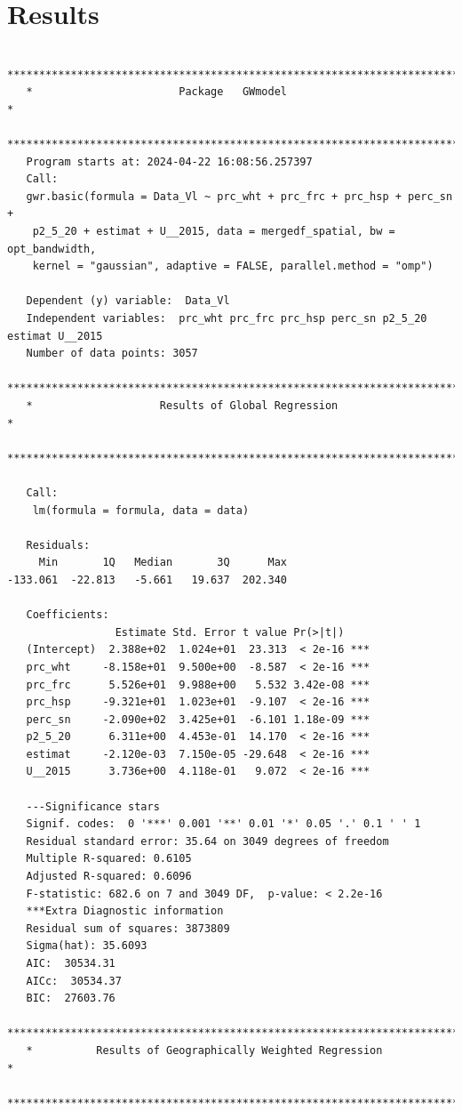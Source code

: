 \documentclass[
]{article}
\begin{document}
\section{Results}\label{results}

\begin{verbatim}
   ***********************************************************************
   *                       Package   GWmodel                             *
   ***********************************************************************
   Program starts at: 2024-04-22 16:08:56.257397 
   Call:
   gwr.basic(formula = Data_Vl ~ prc_wht + prc_frc + prc_hsp + perc_sn + 
    p2_5_20 + estimat + U__2015, data = mergedf_spatial, bw = opt_bandwidth, 
    kernel = "gaussian", adaptive = FALSE, parallel.method = "omp")

   Dependent (y) variable:  Data_Vl
   Independent variables:  prc_wht prc_frc prc_hsp perc_sn p2_5_20 estimat U__2015
   Number of data points: 3057
   ***********************************************************************
   *                    Results of Global Regression                     *
   ***********************************************************************

   Call:
    lm(formula = formula, data = data)

   Residuals:
     Min       1Q   Median       3Q      Max 
-133.061  -22.813   -5.661   19.637  202.340 

   Coefficients:
                 Estimate Std. Error t value Pr(>|t|)    
   (Intercept)  2.388e+02  1.024e+01  23.313  < 2e-16 ***
   prc_wht     -8.158e+01  9.500e+00  -8.587  < 2e-16 ***
   prc_frc      5.526e+01  9.988e+00   5.532 3.42e-08 ***
   prc_hsp     -9.321e+01  1.023e+01  -9.107  < 2e-16 ***
   perc_sn     -2.090e+02  3.425e+01  -6.101 1.18e-09 ***
   p2_5_20      6.311e+00  4.453e-01  14.170  < 2e-16 ***
   estimat     -2.120e-03  7.150e-05 -29.648  < 2e-16 ***
   U__2015      3.736e+00  4.118e-01   9.072  < 2e-16 ***

   ---Significance stars
   Signif. codes:  0 '***' 0.001 '**' 0.01 '*' 0.05 '.' 0.1 ' ' 1 
   Residual standard error: 35.64 on 3049 degrees of freedom
   Multiple R-squared: 0.6105
   Adjusted R-squared: 0.6096 
   F-statistic: 682.6 on 7 and 3049 DF,  p-value: < 2.2e-16 
   ***Extra Diagnostic information
   Residual sum of squares: 3873809
   Sigma(hat): 35.6093
   AIC:  30534.31
   AICc:  30534.37
   BIC:  27603.76
   ***********************************************************************
   *          Results of Geographically Weighted Regression              *
   ***********************************************************************


\end{verbatim}
\end{document}
